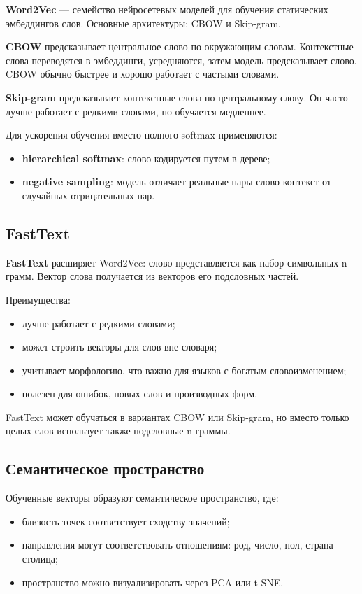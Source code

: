 \textbf{Word2Vec} --- семейство нейросетевых моделей для обучения статических эмбеддингов слов. Основные архитектуры: CBOW и Skip-gram.

\textbf{CBOW} предсказывает центральное слово по окружающим словам. Контекстные слова переводятся в эмбеддинги, усредняются, затем модель предсказывает слово. CBOW обычно быстрее и хорошо работает с частыми словами.

\textbf{Skip-gram} предсказывает контекстные слова по центральному слову. Он часто лучше работает с редкими словами, но обучается медленнее.

Для ускорения обучения вместо полного softmax применяются:
\begin{itemize}
    \item \textbf{hierarchical softmax}: слово кодируется путем в дереве;
    \item \textbf{negative sampling}: модель отличает реальные пары слово-контекст от случайных отрицательных пар.
\end{itemize}

\subsection*{FastText}

\textbf{FastText} расширяет Word2Vec: слово представляется как набор символьных n-грамм. Вектор слова получается из векторов его подсловных частей.

Преимущества:
\begin{itemize}
    \item лучше работает с редкими словами;
    \item может строить векторы для слов вне словаря;
    \item учитывает морфологию, что важно для языков с богатым словоизменением;
    \item полезен для ошибок, новых слов и производных форм.
\end{itemize}

FastText может обучаться в вариантах CBOW или Skip-gram, но вместо только целых слов использует также подсловные n-граммы.

\subsection*{Семантическое пространство}

Обученные векторы образуют семантическое пространство, где:
\begin{itemize}
    \item близость точек соответствует сходству значений;
    \item направления могут соответствовать отношениям: род, число, пол, страна-столица;
    \item пространство можно визуализировать через PCA или t-SNE.
\end{itemize}

